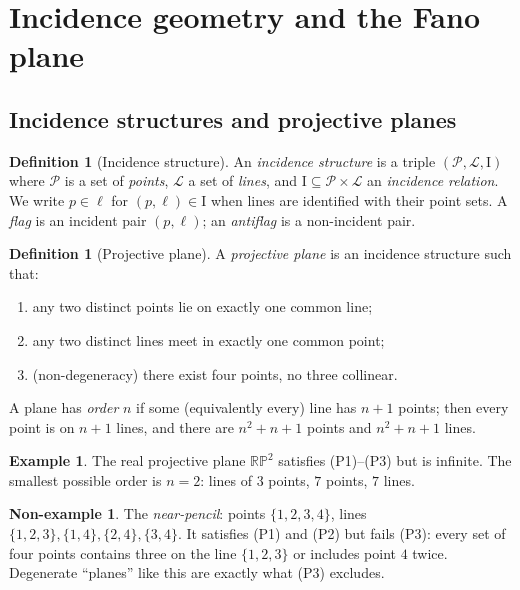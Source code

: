 \documentclass[11pt]{article}
\theoremstyle{definition}
\newtheorem{definition}[theorem]{Definition}
\newtheorem{example}[theorem]{Example}
\newtheorem{nonexample}[theorem]{Non-example}
\begin{document}
\section{Incidence geometry and the Fano plane}

\subsection{Incidence structures and projective planes}

\begin{definition}[Incidence structure]
An \emph{incidence structure} is a triple $(\mathcal P, \mathcal L, \mathrm I)$
where $\mathcal P$ is a set of \emph{points}, $\mathcal L$ a set of
\emph{lines}, and $\mathrm I \subseteq \mathcal P \times \mathcal L$ an
\emph{incidence relation}. We write $p \in \ell$ for $(p,\ell)\in\mathrm I$
when lines are identified with their point sets. A \emph{flag} is an incident
pair $(p,\ell)$; an \emph{antiflag} is a non-incident pair.
\end{definition}

\begin{definition}[Projective plane]\label{def:projplane}
A \emph{projective plane} is an incidence structure such that:
\begin{enumerate}
\item[(P1)] any two distinct points lie on exactly one common line;
\item[(P2)] any two distinct lines meet in exactly one common point;
\item[(P3)] (non-degeneracy) there exist four points, no three collinear.
\end{enumerate}
A plane has \emph{order} $n$ if some (equivalently every) line has $n+1$
points; then every point is on $n+1$ lines, and there are $n^2+n+1$ points and
$n^2+n+1$ lines.
\end{definition}

\begin{example}
The real projective plane $\mathbb{RP}^2$ satisfies (P1)--(P3) but is infinite.
The smallest possible order is $n = 2$: lines of $3$ points, $7$ points,
$7$ lines.
\end{example}

\begin{nonexample}
The \emph{near-pencil}: points $\{1,2,3,4\}$, lines
$\{1,2,3\},\{1,4\},\{2,4\},\{3,4\}$. It satisfies (P1) and (P2) but fails (P3):
every set of four points contains three on the line $\{1,2,3\}$ or includes
point $4$ twice. Degenerate ``planes'' like this are exactly what (P3)
excludes.
\end{nonexample}
\end{document}
